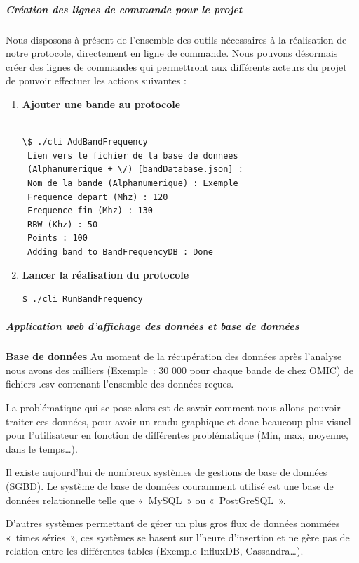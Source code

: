     \subparagraph{Création des lignes de commande pour le projet}
        Nous disposons à présent de l'ensemble des outils nécessaires à la réalisation de notre protocole,
            directement en ligne de commande. Nous pouvons désormais créer des lignes de commandes qui
            permettront aux différents acteurs du projet de pouvoir effectuer les actions suivantes :
            \begin{enumerate}
                  \item \textbf{Ajouter une bande au protocole}
\begin{lstlisting}[frame=single]  % Start your code-block

\$ ./cli AddBandFrequency
 Lien vers le fichier de la base de donnees
 (Alphanumerique + \/) [bandDatabase.json] :
 Nom de la bande (Alphanumerique) : Exemple
 Frequence depart (Mhz) : 120
 Frequence fin (Mhz) : 130
 RBW (Khz) : 50
 Points : 100
 Adding band to BandFrequencyDB : Done
\end{lstlisting}

                  \item \textbf{Lancer la réalisation du protocole}
                  \begin{lstlisting}[frame=single]
$ ./cli RunBandFrequency\end{lstlisting}
            \end{enumerate}

    \subparagraph{Application web d’affichage des données et base de données}
    \textbf{Base de données}
        Au moment de la récupération des données après l’analyse nous avons des milliers
            (Exemple : 30 000 pour chaque bande de chez OMIC) de fichiers .csv contenant l’ensemble des données reçues.

        La problématique qui se pose alors est de savoir comment nous allons pouvoir traiter ces données,
            pour avoir un rendu graphique et donc beaucoup plus visuel pour l’utilisateur
            en fonction de différentes problématique (Min, max, moyenne, dans le temps…).

        Il existe aujourd’hui de nombreux systèmes de gestions de base de données (SGBD).
            Le système de base de données couramment utilisé est une base de données relationnelle
            telle que « MySQL » ou « PostGreSQL ».

        D’autres systèmes permettant de gérer un plus gros flux de données nommées « times séries »,
            ces systèmes se basent sur l’heure d’insertion et ne gère pas de relation entre les différentes tables
            (Exemple InfluxDB, Cassandra…).

